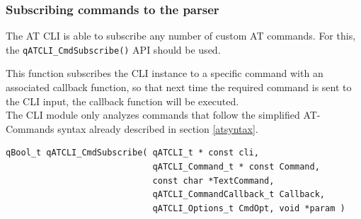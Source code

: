\documentclass{article}
\begin{document}
\subsubsection{Subscribing commands to the parser}
The AT CLI is able to subscribe any number of custom AT commands. For this, the 
\lstinline{qATCLI_CmdSubscribe()}  API should be used.

This function subscribes the CLI instance to a specific command with an associated callback function, so that next time the required command is sent to the CLI input, the callback function will be executed. \\
The CLI module only analyzes commands that follow the simplified AT-Commands syntax already described in section \ref{atsyntax}. \\

\begin{lstlisting}[style=CStyle]
qBool_t qATCLI_CmdSubscribe( qATCLI_t * const cli, 
                             qATCLI_Command_t * const Command, 
                             const char *TextCommand, 
                             qATCLI_CommandCallback_t Callback, 
                             qATCLI_Options_t CmdOpt, void *param )
\end{lstlisting}
\end{document}
